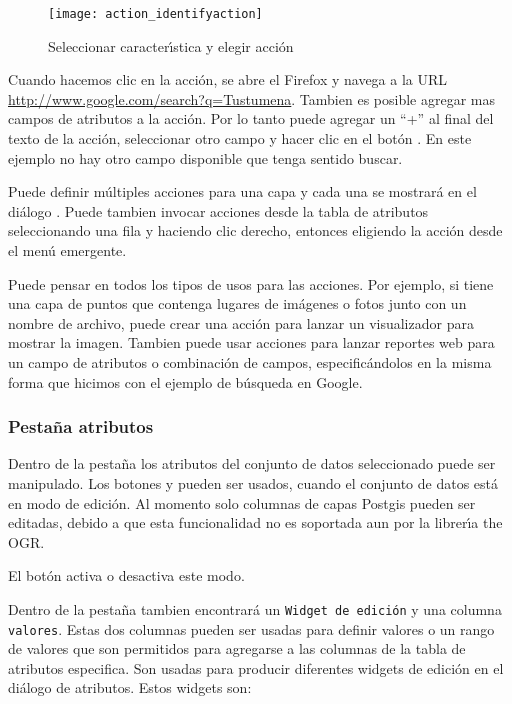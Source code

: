 \begin{figure}[H]
   \begin{center}
   \caption{Seleccionar caracter\'{\i}stica y elegir acci\'on \nixcaption}\label{fig:identify_action}\smallskip
   \texttt{[image: action\_identifyaction]} 
\end{center}  
\end{figure}

Cuando hacemos clic en la acci\'on, se abre el Firefox y navega a la URL
\url{http://www.google.com/search?q=Tustumena}. Tambien es posible agregar mas 
campos de atributos a la acci\'on. Por lo tanto puede agregar un ``+'' al final del texto de la acci\'on, 
seleccionar otro campo y hacer clic en el bot\'on . En este ejemplo no
hay otro campo disponible que tenga sentido buscar.

Puede definir m\'ultiples acciones para una capa y cada una se mostrar\'a en el
di\'alogo . Puede tambien invocar acciones desde la tabla de atributos
seleccionando una fila y haciendo clic derecho, entonces eligiendo la acci\'on desde el men\'u
emergente.

Puede pensar en todos los tipos de usos para las acciones. Por ejemplo, si tiene una capa de puntos
que contenga lugares de im\'agenes o fotos junto con un nombre de archivo, puede
crear una acci\'on para lanzar un visualizador para mostrar la imagen. Tambien puede usar
acciones para lanzar reportes web para un campo de atributos o combinaci\'on de
campos, especific\'andolos en la misma forma que hicimos con el ejemplo de b\'usqueda en Google.

\subsubsection{Pesta\~na atributos}\label{label_attributes}
Dentro de la pesta\~na  los atributos del conjunto de datos seleccionado puede ser manipulado.
Los botones  y  pueden ser usados,
cuando el conjunto de datos est\'a en modo de edici\'on. Al momento solo columnas
de capas Postgis pueden ser editadas, debido a que esta funcionalidad no es soportada aun 
por la librer\'{\i}a the OGR. 

El bot\'on  activa o desactiva este modo.


Dentro de la pesta\~na  tambien encontrar\'a un \texttt{Widget de edici\'on} y una columna 
\texttt{valores}. Estas dos columnas pueden ser usadas para definir valores o un rango 
de valores que son permitidos para agregarse a las columnas de la tabla de atributos especifica. 
Son usadas para producir diferentes widgets de edici\'on en el di\'alogo de atributos. Estos 
widgets son:


